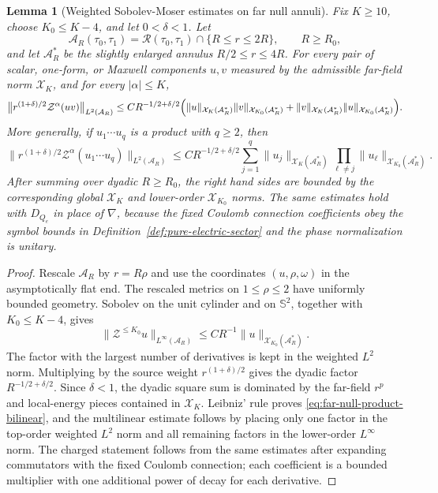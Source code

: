 \documentclass[11pt]{article}
\numberwithin{equation}{section}
\theoremstyle{plain}
\newtheorem{lemma}[theorem]{Lemma}
\theoremstyle{definition}
\theoremstyle{remark}
\begin{document}
\medskip

\begin{lemma}[Weighted Sobolev-Moser estimates on far null annuli]\label{lem:far-null-sobolev-moser}
Fix \(K\ge10\), choose \(K_0\le K-4\), and let \(0<\delta<1\).  Let
\[
 \mathcal A_R(\tau_0,\tau_1)=\mathcal R(\tau_0,\tau_1)\cap\{R\le r\le 2R\},\qquad R\ge R_0,
\]
and let \(\mathcal A_R^\ast\) be the slightly enlarged annulus \(R/2\le r\le4R\).  For every pair of scalar, one-form, or Maxwell components \(u,v\) measured by the admissible far-field norm \(\mathcal X_K\), and for every \(|\alpha|\le K\),
\begin{equation}\label{eq:far-null-product-bilinear}
 \bigl\|r^{(1+\delta)/2}\mathcal Z^\alpha(uv)\bigr\|_{L^2(\mathcal A_R)}
 \le C R^{-1/2+\delta/2}\Bigl(
 \|u\|_{\mathcal X_K(\mathcal A_R^\ast)}\|v\|_{\mathcal X_{K_0}(\mathcal A_R^\ast)}
 +\|v\|_{\mathcal X_K(\mathcal A_R^\ast)}\|u\|_{\mathcal X_{K_0}(\mathcal A_R^\ast)}\Bigr).
\end{equation}
More generally, if \(u_1\cdots u_q\) is a product with \(q\ge2\), then
\begin{equation}\label{eq:far-null-product-multilinear}
 \bigl\|r^{(1+\delta)/2}\mathcal Z^\alpha(u_1\cdots u_q)\bigr\|_{L^2(\mathcal A_R)}
 \le C R^{-1/2+\delta/2}
 \sum_{j=1}^{q}\|u_j\|_{\mathcal X_K(\mathcal A_R^\ast)}
 \prod_{\ell\ne j}\|u_\ell\|_{\mathcal X_{K_0}(\mathcal A_R^\ast)}.
\end{equation}
After summing over dyadic \(R\ge R_0\), the right hand sides are bounded by the corresponding global \(\mathcal X_K\) and lower-order \(\mathcal X_{K_0}\) norms.  The same estimates hold with \(D_{Q_e}\) in place of \(\nabla\), because the fixed Coulomb connection coefficients obey the symbol bounds in Definition~\ref{def:pure-electric-sector} and the phase normalization is unitary.
\end{lemma}

\begin{proof}
Rescale \(\mathcal A_R\) by \(r=R\rho\) and use the coordinates \((u,\rho,\omega)\) in the asymptotically flat end.  The rescaled metrics on \(1\le\rho\le2\) have uniformly bounded geometry.  Sobolev on the unit cylinder and on \(\mathbb S^2\), together with \(K_0\le K-4\), gives
\[
 \|\mathcal Z^{\le K_0}u\|_{L^\infty(\mathcal A_R)}
 \le C R^{-1}\|u\|_{\mathcal X_{K_0}(\mathcal A_R^\ast)}.
\]
The factor with the largest number of derivatives is kept in the weighted \(L^2\) norm.  Multiplying by the source weight \(r^{(1+\delta)/2}\) gives the dyadic factor \(R^{-1/2+\delta/2}\).  Since \(\delta<1\), the dyadic square sum is dominated by the far-field \(r^p\) and local-energy pieces contained in \(\mathcal X_K\).  Leibniz' rule proves \eqref{eq:far-null-product-bilinear}, and the multilinear estimate follows by placing only one factor in the top-order weighted \(L^2\) norm and all remaining factors in the lower-order \(L^\infty\) norm.  The charged statement follows from the same estimates after expanding commutators with the fixed Coulomb connection; each coefficient is a bounded multiplier with one additional power of decay for each derivative.
\end{proof}
\end{document}
